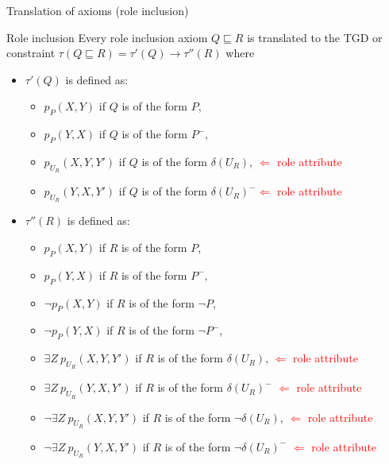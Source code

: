 \documentclass{beamer}
\begin{document}
 \begin{frame}{Translation of axioms (role inclusion)}
  
  
  \begin{block}{Role inclusion}
  \small
 Every role inclusion axiom $Q \sqsubseteq R$ is translated to the TGD or constraint $\tau (Q \sqsubseteq R) = \tau'(Q) \rightarrow \tau''(R)$ where
 
 \begin{itemize}
 
  \small
 \item $ \tau'(Q) $ is defined as:

 \begin{itemize}
  \tiny
 \item  $p_P(X,Y)$ if $Q$ is of the form $P$,
 \item  $p_P(Y,X)$ if $Q$ is of the form $P^-$,
 \item $p_{U_R}(X, Y, Y')$ if $Q$ is of the form $\delta(U_R)$, \textcolor{red}{$\Leftarrow$ role attribute}
  \item $p_{U_R}(Y, X, Y')$ if $Q$ is of the form $\delta(U_R)^-$\textcolor{red}{$\Leftarrow$ role attribute}
 \end{itemize}
 
 \item $ \tau''(R) $ is defined as:
 
 \begin{itemize}
  \tiny
 \item  $p_P(X,Y)$ if $R$ is of the form $P$,
 \item  $p_P(Y,X)$ if $R$ is of the form $P^-$,
  \item  $\neg p_P(X,Y)$ if $R$ is of the form $\neg P$,
 \item  $\neg p_P(Y,X)$ if $R$ is of the form $\neg P^-$,
  \item $\exists Z~ p_{U_R}(X, Y, Y')$ if $R$ is of the form $\delta(U_R)$, \textcolor{red}{$\Leftarrow$ role attribute}
 \item $\exists Z~ p_{U_R}(Y, X, Y')$ if $R$ is of the form $\delta(U_R)^-$ \textcolor{red}{$\Leftarrow$ role attribute}
   \item $\neg \exists Z~ p_{U_R}(X, Y, Y')$ if $R$ is of the form $\neg \delta(U_R)$, \textcolor{red}{$\Leftarrow$ role attribute}
    \item $\neg \exists Z~ p_{U_R}(Y, X, Y')$ if $R$ is of the form $\neg \delta(U_R)^-$
 \textcolor{red}{$\Leftarrow$ role attribute}
 \end{itemize}
 
 \end{itemize}
 
 \end{block}
 
 \end{frame}
 
\end{document}

